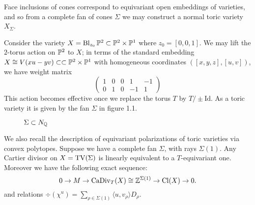 Face inclusions of cones correspond to equivariant open embeddings of varieties, and so from a complete fan of cones \(\Sigma\) we may construct a normal toric variety \(X_\Sigma\).
\begin{example}
Consider the variety \(X = \operatorname{Bl}_{z_0} \mathbb{P}^2 \subset \mathbb{P}^2 \times \mathbb{P}^1 \) where \(z_0 = [0,0,1]\). We may lift the \(2\)-torus action on \(\mathbb{P}^2\) to \(X\); in terms of the standard embedding \(X \cong V(xu-yv) \subset \subset \mathbb{P}^2 \times \mathbb{P}^1\) with homogeneous coordinates \(([x,y,z],[u,v])\), we have weight matrix
\[
\begin{pmatrix}
1 & 0 & 0 & 1 & -1 \\ 0 & 1 & 0 & -1 & 1
\end{pmatrix}
\]
This action becomes effective once we replace the torus \(T\) by \(T/ \pm \text{Id}\). As a toric variety it is given by the fan \(\Sigma\) in figure 1.1.

\begin{figure}[h] \label{fig:toricfan}
\centering
	\caption{$\Sigma \subset N_{\mathbb{Q}}$}
\end{figure}
\end{example}
We also recall the description of equivariant polarizations of toric varieties via convex polytopes. Suppose we have a complete fan \(\Sigma\), with rays \(\Sigma(1)\). Any Cartier divisor on \(X = \operatorname{TV}(\Sigma)\) is linearly equivalent to a \(T\)-equivariant one. Moreover we have the following exact sequence:
\[
0 \to M \to \operatorname{CaDiv}_T(X) \cong \mathbb{Z}^{\Sigma(1)} \to \operatorname{Cl}(X) \to 0.
\]
and relations \(\div(\chi^u) = \sum_{\rho \in \Sigma(1)} \langle u, v_\rho \rangle D_\rho\).


